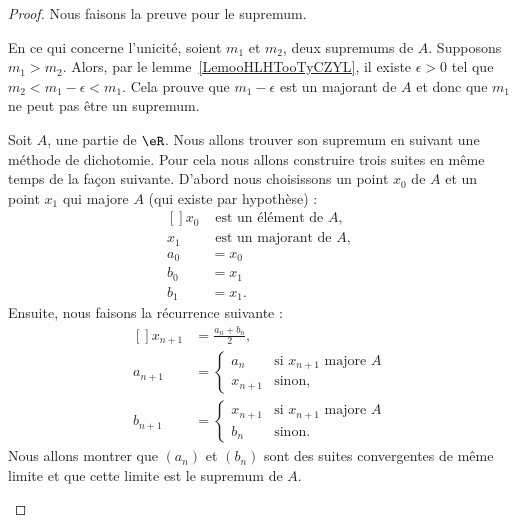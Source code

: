 \begin{proof}
    Nous faisons la preuve pour le supremum.

    \begin{subproof}
    \item[Unicité]

    En ce qui concerne l'unicité, soient \( m_1\) et \( m_2\), deux supremums de \( A\). Supposons \( m_1 > m_2\). Alors, par le lemme~\ref{LemooHLHTooTyCZYL}, il existe \( \epsilon>0\) tel que \( m_2<m_1-\epsilon<m_1\). Cela prouve que \( m_1-\epsilon\) est un majorant de \( A\) et donc que \( m_1\) ne peut pas être un supremum.

\item[Existence]

	Soit $A$, une partie de $\eR$. Nous allons trouver son supremum en suivant une méthode de dichotomie. Pour cela nous allons construire trois suites en même temps de la façon suivante. D'abord nous choisissons un point $x_0$ de $A$ et un point $x_1$ qui majore $A$ (qui existe par hypothèse) :
	\begin{equation}
		\begin{aligned}[]
			x_0&\text{ est un élément de }A,\\
			x_1&\text{ est un majorant de }A,\\
			a_0&=x_0\\
			b_0&=x_1\\
			b_1&=x_1.
		\end{aligned}
	\end{equation}
	Ensuite, nous faisons la récurrence suivante :
	\begin{equation}
		\begin{aligned}[]
			x_{n+1}&=\frac{ a_n+b_n }{2},\\
			a_{n+1}&=\begin{cases}
                          a_{n}	&	\text{si }x_{n+1} \text{ majore } A \\
                          x_{n+1}	&	 \text{sinon},
			\end{cases}\\
			b_{n+1}&=\begin{cases}
                x_{n+1}	&	\text{si }x_{n+1} \text{ majore } A\\
				b_n	&	 \text{sinon}.
			\end{cases}
		\end{aligned}
	\end{equation}
    Nous allons montrer que \( (a_n)\) et \( (b_n)\) sont des suites convergentes de même limite et que cette limite est le supremum de \( A\).


\end{subproof}
\end{proof}

